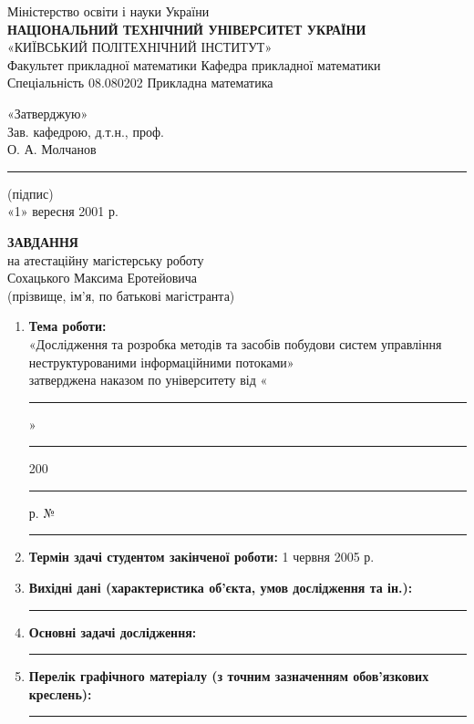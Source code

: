 \documentclass{memoir}
\begin{document}
\newpage

\begin{center}
    {\small Міністерство освіти і науки України}\\[0.3cm]
    {\large \textbf{НАЦІОНАЛЬНИЙ ТЕХНІЧНИЙ УНІВЕРСИТЕТ УКРАЇНИ}}\\[0.3cm]
    {\large «КИЇВСЬКИЙ ПОЛІТЕХНІЧНИЙ ІНСТИТУТ»}\\[0.5cm]
    {\normalsize Факультет прикладної математики \hfill Кафедра прикладної математики}\\[0.3cm]
    {\normalsize Спеціальність 08.080202 \hfill Прикладна математика}\\[1cm]
    
    \begin{flushright}
        \parbox{0.45\textwidth}{
            \raggedright
            «Затверджую»\\
            Зав. кафедрою, д.т.н., проф.\\
            О. А. Молчанов\\
            \rule{3cm}{0.4pt} \hfill (підпис)\\
            «1» вересня 2001 р.
        }
    \end{flushright}
    
    \vspace{0.5cm}
    {\large \textbf{ЗАВДАННЯ}}\\[0.3cm]
    {\normalsize на атестаційну магістерську роботу}\\[0.3cm]
    {\normalsize Сохацького Максима Еротейовича}\\[0.3cm]
    {\small (прізвище, ім’я, по батькові магістранта)}
\end{center}

\begin{enumerate}
    \item \textbf{Тема роботи:} \\
    «Дослідження та розробка методів та засобів побудови систем управління неструктурованими інформаційними потоками» \\
    затверджена наказом по університету від «\rule{1cm}{0.4pt}» \rule{2cm}{0.4pt} 200\rule{0.5cm}{0.4pt} р. №\rule{1cm}{0.4pt}
    
    \item \textbf{Термін здачі студентом закінченої роботи:} 1 червня 2005 р.
    
    \item \textbf{Вихідні дані (характеристика об’єкта, умов дослідження та ін.):} \\
    \rule{\textwidth}{0.4pt}
    
    \item \textbf{Основні задачі дослідження:} \\
    \rule{\textwidth}{0.4pt}
    
    \item \textbf{Перелік графічного матеріалу (з точним зазначенням обов’язкових креслень):} \\
    \rule{\textwidth}{0.4pt}
\end{enumerate}
\end{document}
